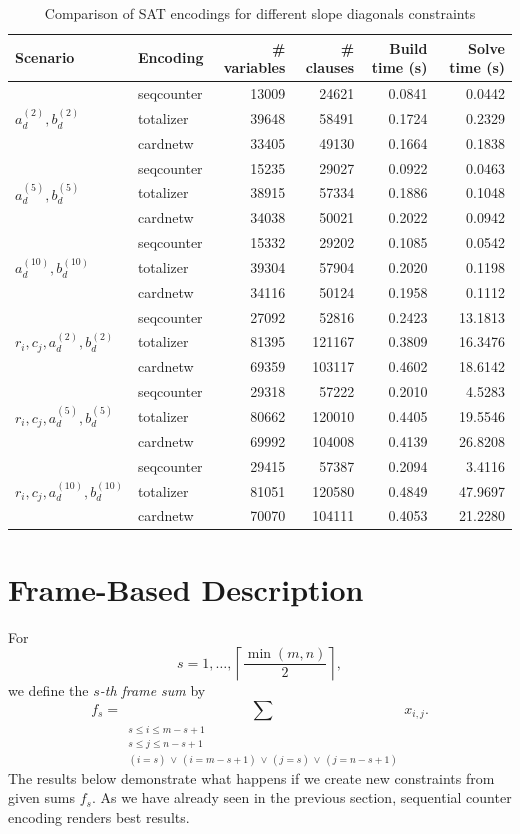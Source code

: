 \documentclass{report}
\begin{document}
\begin{table}[H]
\centering
\begin{tabular}{llrrrr}
\toprule
Scenario & Encoding & \# variables & \# clauses & Build time (s) & Solve time (s) \\
\midrule
\multirow{3}{*}{$a_d^{(2)}, b_d^{(2)}$}
 & seqcounter & 13009 & 24621 & 0.0841 & 0.0442 \\
 & totalizer  & 39648 & 58491 & 0.1724 & 0.2329 \\
 & cardnetw   & 33405 & 49130 & 0.1664 & 0.1838 \\
\midrule
\multirow{3}{*}{$a_d^{(5)}, b_d^{(5)}$}
 & seqcounter & 15235 & 29027 & 0.0922 & 0.0463 \\
 & totalizer  & 38915 & 57334 & 0.1886 & 0.1048 \\
 & cardnetw   & 34038 & 50021 & 0.2022 & 0.0942 \\
\midrule
\multirow{3}{*}{$a_d^{(10)}, b_d^{(10)}$}
 & seqcounter & 15332 & 29202 & 0.1085 & 0.0542 \\
 & totalizer  & 39304 & 57904 & 0.2020 & 0.1198 \\
 & cardnetw   & 34116 & 50124 & 0.1958 & 0.1112 \\
\midrule
\multirow{3}{*}{$r_i,c_j, a_d^{(2)}, b_d^{(2)}$}
 & seqcounter & 27092 & 52816 & 0.2423 & 13.1813 \\
 & totalizer  & 81395 & 121167 & 0.3809 & 16.3476 \\
 & cardnetw   & 69359 & 103117 & 0.4602 & 18.6142 \\
\midrule
\multirow{3}{*}{$r_i,c_j, a_d^{(5)}, b_d^{(5)}$}
 & seqcounter & 29318 & 57222 & 0.2010 & 4.5283 \\
 & totalizer  & 80662 & 120010 & 0.4405 & 19.5546 \\
 & cardnetw   & 69992 & 104008 & 0.4139 & 26.8208 \\
\midrule
\multirow{3}{*}{$r_i,c_j, a_d^{(10)}, b_d^{(10)}$}
 & seqcounter & 29415 & 57387 & 0.2094 & 3.4116 \\
 & totalizer  & 81051 & 120580 & 0.4849 & 47.9697 \\
 & cardnetw   & 70070 & 104111 & 0.4053 & 21.2280 \\
\bottomrule
\end{tabular}
\caption{Comparison of SAT encodings for different slope diagonals constraints}
\label{tab:combined-encodings}
\end{table}


\newpage
\section{Frame-Based Description}
For
\[
s = 1, \dots, \left\lceil \frac{\min(m,n)}{2} \right\rceil,
\]
we define the \emph{$s$-th frame sum} by
\[
f_s
=
\sum_{\substack{
s \le i \le m-s+1 \\
s \le j \le n-s+1 \\
(i = s) \,\lor\, (i = m-s+1) \,\lor\, (j = s) \,\lor\, (j = n-s+1)
}}
x_{i,j}.
\]
The results below demonstrate what happens if we create new constraints from given sums \(f_s\). As we have already seen in the previous section, sequential counter encoding renders best results.
\end{document}
